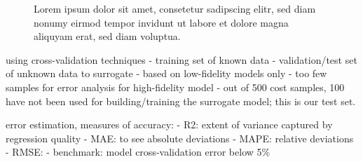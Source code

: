 \begin{figure}
    \noindent{}
    \noindent{}
    \caption{Lorem ipsum dolor sit amet, consetetur sadipscing elitr, sed diam nonumy eirmod tempor invidunt ut labore et dolore magna aliquyam erat, sed diam voluptua.}
    \label{fig:error}
\end{figure}


using cross-validation techniques 
- training set of known data
- validation/test set of unknown data to surrogate \cite{gratiet_metamodel-based_2015}
- based on low-fidelity models only
- too few samples for error analysis for high-fidelity model
- out of 500 cost samples, 100 have not been used for building/training the surrogate model; this is our test set.

error estimation, measures of accuracy:
- R2: extent of variance captured by regression quality
- MAE: to see absolute deviations
- MAPE: relative deviations
- RMSE:
- benchmark: model cross-validation error below 5\% \cite{trondle_trade-offs_2020}

